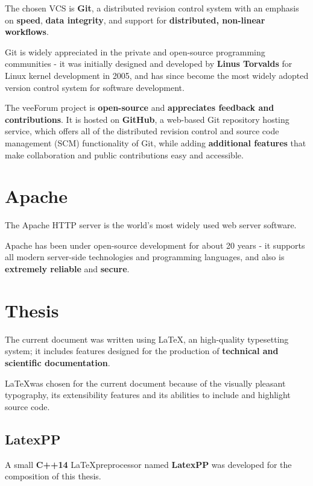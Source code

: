 \documentclass[12pt]{report}
\renewcommand\emph{\textbf}
\begin{document}
                The chosen VCS is \emph{Git}, a distributed revision control system with an emphasis on \emph{speed}, \emph{data integrity}, and support for \emph{distributed, non-linear workflows}.

                Git is widely appreciated in the private and open-source programming communities - it was initially designed and developed by \emph{Linus Torvalds} for Linux kernel development in 2005, and has since become the most widely adopted version control system for software development.

                The veeForum project is \emph{open-source} and \emph{appreciates feedback and contributions}. It is hosted on \emph{GitHub}, a web-based Git repository hosting service, which offers all of the distributed revision control and source code management (SCM) functionality of Git, while adding \emph{additional features} that make collaboration and public contributions easy and accessible.

            \section{Apache}
                The Apache HTTP server is the world's most widely used web server software.

                Apache has been under open-source development for about 20 years - it supports all modern server-side technologies and programming languages, and also is \emph{extremely reliable} and \emph{secure}.

            \section{Thesis}
                The current document was written using \LaTeX, an high-quality typesetting system; it includes features designed for the production of \emph{technical and scientific documentation}.

                \LaTeX was chosen for the current document because of the visually pleasant typography, its extensibility features and its abilities to include and highlight source code.

                \subsection{LatexPP}
                    A small \emph{C++14} \LaTeX preprocessor named \emph{LatexPP} was developed for the composition of this thesis.
\end{document}
